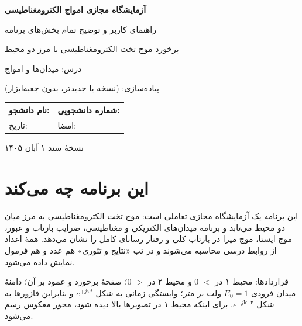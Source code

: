 \documentclass[12pt,a4paper]{article}
\begin{document}
\begin{titlepage}
  \centering
  \vspace*{2.5cm}
  {\Huge\bfseries آزمایشگاه مجازی امواج الکترومغناطیسی\par}
  \vspace{0.6cm}
  {\LARGE\bfseries {}\par}
  \vspace{1.6cm}
  {\Large راهنمای کاربر و توضیح تمام بخش‌های برنامه\par}
  \vspace{0.5cm}
  {\large برخورد موج تخت الکترومغناطیسی با مرز دو محیط\par}
  \vspace{2.2cm}
  {\large درس: میدان‌ها و امواج\par}
  \vspace{0.4cm}
  {\large پیاده‌سازی:  (نسخه  یا جدیدتر، بدون جعبه‌ابزار)\par}
  \vspace{2.0cm}
  \begin{tabular}{p{6cm}p{6cm}}
    \hline
    نام دانشجو: & شماره دانشجویی: \\[0.9cm]
    \hline
    تاریخ: & امضا: \\[0.9cm]
    \hline
  \end{tabular}
  \vfill
  {\small نسخۀ سند ۱ \lr{---} آبان ۱۴۰۵\par}
\end{titlepage}

\tableofcontents
\newpage
\listoffigures
\newpage

\section{این برنامه چه می‌کند}

این برنامه یک آزمایشگاه مجازی تعاملی است: موج تخت الکترومغناطیسی به مرز میان دو محیط می‌تابد و برنامه میدان‌های الکتریکی و مغناطیسی، ضرایب بازتاب و عبور، موج ایستا، موج میرا در بازتاب کلی و رفتار رسانای کامل را نشان می‌دهد. همۀ اعداد از روابط درسی محاسبه می‌شوند و در تب «نتایج و تئوری» هم عدد و هم فرمول نمایش داده می‌شود.

قراردادها: محیط ۱ در  $<$ 0 و محیط ۲ در  $>$ 0؛ صفحۀ برخورد  و  عمود بر آن؛ دامنۀ میدان فرودی $E_0=1$ ولت بر متر؛ وابستگی زمانی به شکل $e^{+j\omega t}$ و بنابراین فازورها به شکل $e^{-j\mathbf{k}\cdot\mathbf{r}}$. برای اینکه محیط ۱ در تصویرها بالا دیده شود، محور  معکوس رسم می‌شود.
\end{document}

